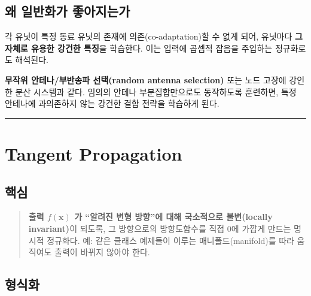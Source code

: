 \documentclass[
  letterpaper,
  DIV=11,
  numbers=noendperiod]{scrreprt}
\begin{document}
\section{왜 일반화가
좋아지는가}\label{uxc65c-uxc77cuxbc18uxd654uxac00-uxc88buxc544uxc9c0uxb294uxac00}

각 유닛이 특정 동료 유닛의 존재에 의존(co-adaptation)할 수 없게 되어,
유닛마다 \textbf{그 자체로 유용한 강건한 특징}을 학습한다. 이는 입력에
곱셈적 잡음을 주입하는 정규화로도 해석된다.

\begin{tcolorbox}[enhanced jigsaw, arc=.35mm, bottomrule=.15mm, bottomtitle=1mm, breakable, colback=white, colbacktitle=quarto-callout-note-color!10!white, colframe=quarto-callout-note-color-frame, coltitle=black, left=2mm, leftrule=.75mm, opacityback=0, opacitybacktitle=0.6, rightrule=.15mm, title=\textcolor{quarto-callout-note-color}{\faInfo}\hspace{0.5em}{무선통신 비유}, titlerule=0mm, toprule=.15mm, toptitle=1mm]

\textbf{무작위 안테나/부반송파 선택(random antenna selection)} 또는 노드
고장에 강인한 분산 시스템과 같다. 임의의 안테나 부분집합만으로도
동작하도록 훈련하면, 특정 안테나에 과의존하지 않는 강건한 결합 전략을
학습하게 된다.

\end{tcolorbox}

\begin{center}\rule{0.5\linewidth}{0.5pt}\end{center}

\chapter{Tangent Propagation}\label{sec-tangent}

\section{핵심}\label{uxd575uxc2ec-8}

\begin{quote}
\textbf{출력 \(f(\bm{x})\) 가 ``알려진 변형 방향''에 대해 국소적으로
불변(locally invariant)}이 되도록, 그 방향으로의 방향도함수를 직접 0에
가깝게 만드는 명시적 정규화다. 예: 같은 클래스 예제들이 이루는
매니폴드(manifold)를 따라 움직여도 출력이 바뀌지 않아야 한다.
\end{quote}

\section{형식화}\label{uxd615uxc2dduxd654-2}
\end{document}
